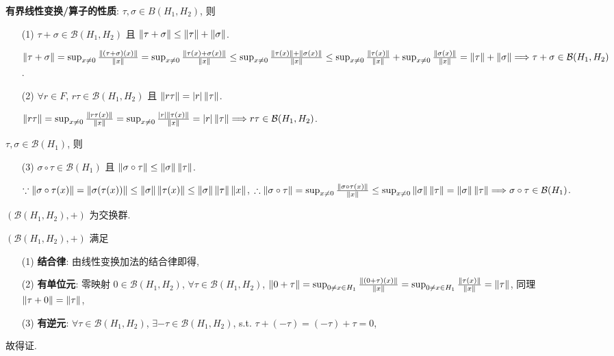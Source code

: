 \documentclass{note}
\begin{document}
\textbf{有界线性变换/算子的性质}: $\tau,\sigma\in B(H_1,H_2)$, 则
\begin{itemize}
    \item[(1)] $\tau+\sigma\in\mathcal{B}(H_1,H_2)$ 且 $\left\lVert\tau+\sigma\right\rVert\leq\left\lVert\tau\right\rVert+\left\lVert\sigma\right\rVert$.
    \begin{pf}
        $\left\lVert\tau+\sigma\right\rVert=\sup_{x\neq 0}\frac{\left\lVert(\tau+\sigma)(x)\right\rVert}{\left\lVert x\right\rVert}=\sup_{x\neq 0}\frac{\left\lVert\tau(x)+\sigma(x)\right\rVert}{\left\lVert x\right\rVert}\leq\sup_{x\neq 0}\frac{\left\lVert\tau(x)\right\rVert+\left\lVert\sigma(x)\right\rVert}{\left\lVert x\right\rVert}\leq\sup_{x\neq 0}\frac{\left\lVert\tau(x)\right\rVert}{\left\lVert x\right\rVert}+\sup_{x\neq 0}\frac{\left\lVert\sigma(x)\right\rVert}{\left\lVert x\right\rVert}=\left\lVert\tau\right\rVert+\left\lVert\sigma\right\rVert\Longrightarrow\tau+\sigma\in\mathcal{B}(H_1,H_2)$.
    \end{pf}
    \item[(2)] $\forall r\in F$, $r\tau\in\mathcal{B}(H_1,H_2)$ 且 $\left\lVert r\tau\right\rVert=\left\lvert r\right\rvert\left\lVert\tau\right\rVert$.
    \begin{pf}
        $\left\lVert r\tau\right\rVert=\sup_{x\neq 0}\frac{\left\lVert r\tau(x)\right\rVert}{\left\lVert x\right\rVert}=\sup_{x\neq 0}\frac{\left\lvert r\right\rvert\left\lVert\tau(x)\right\rVert}{\left\lVert x\right\rVert}=\left\lvert r\right\rvert\left\lVert\tau\right\rVert\Longrightarrow r\tau\in\mathcal{B}(H_1,H_2)$.
    \end{pf}
\end{itemize}
$\tau,\sigma\in\mathcal{B}(H_1)$, 则
\begin{itemize}
    \item[(3)] $\sigma\circ\tau\in\mathcal{B}(H_1)$ 且 $\left\lVert\sigma\circ\tau\right\rVert\leq\left\lVert\sigma\right\rVert\left\lVert\tau\right\rVert$.
    \begin{pf}
        $\because\left\lVert\sigma\circ\tau(x)\right\rVert=\left\lVert\sigma(\tau(x))\right\rVert\leq\left\lVert\sigma\right\rVert\left\lVert\tau(x)\right\rVert\leq\left\lVert\sigma\right\rVert\left\lVert\tau\right\rVert\left\lVert x\right\rVert$, $\therefore\left\lVert\sigma\circ\tau\right\rVert=\sup_{x\neq 0}\frac{\left\lVert\sigma\circ\tau(x)\right\rVert}{\left\lVert x\right\rVert}\leq\sup_{x\neq 0}\left\lVert\sigma\right\rVert\left\lVert\tau\right\rVert=\left\lVert\sigma\right\rVert\left\lVert\tau\right\rVert\Longrightarrow\sigma\circ\tau\in\mathcal{B}(H_1)$.
    \end{pf}
\end{itemize}

$(\mathcal{B}(H_1,H_2),+)$ 为交换群.
\begin{pf}
    $(\mathcal{B}(H_1,H_2),+)$ 满足
    \begin{itemize}
        \item[(1)] \textbf{结合律}: 由线性变换加法的结合律即得,
        \item[(2)] \textbf{有单位元}: 零映射 $0\in\mathcal{B}(H_1,H_2)$, $\forall\tau\in\mathcal{B}(H_1,H_2)$, $\left\lVert0+\tau\right\rVert=\sup_{0\neq x\in H_1}\frac{\left\lVert(0+\tau)(x)\right\rVert}{\left\lVert x\right\rVert}=\sup_{0\neq x\in H_1}\frac{\left\lVert\tau(x)\right\rVert}{\left\lVert x\right\rVert}=\left\lVert\tau\right\rVert$, 同理 $\left\lVert\tau+0\right\rVert=\left\lVert\tau\right\rVert$,
        \item[(3)] \textbf{有逆元}: $\forall\tau\in\mathcal{B}(H_1,H_2)$, $\exists-\tau\in\mathcal{B}(H_1,H_2)$, s.t. $\tau+(-\tau)=(-\tau)+\tau=0$,
    \end{itemize}
    故得证.
\end{pf}
\end{document}
